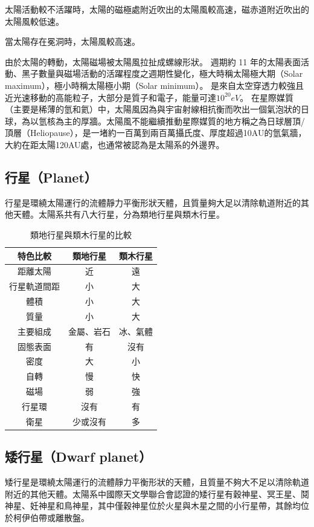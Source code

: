 \documentclass[a4paper,12pt]{report}
\begin{document}
太陽活動較不活躍時，太陽的磁極處附近吹出的太陽風較高速，磁赤道附近吹出的太陽風較低速。

當太陽存在冕洞時，太陽風較高速。

由於太陽的轉動，太陽磁場被太陽風拉扯成螺線形狀。
週期約 11 年的太陽表面活動、黑子數量與磁場活動的活躍程度之週期性變化，極大時稱太陽極大期（Solar maximum），極小時稱太陽極小期（Solar minimum）。
是來自太空穿透力較強且近光速移動的高能粒子，大部分是質子和電子，能量可達$10^20 eV$。
在星際媒質（主要是稀薄的氫和氦）中，太陽風因為與宇宙射線相抗衡而吹出一個氣泡狀的日球，為以氫核為主的厚牆。太陽風不能繼續推動星際媒質的地方稱之為日球層頂/頂層（Heliopause），是一堵約一百萬到兩百萬攝氏度、厚度超過10AU的氫氣牆，大約在距太陽120AU處，也通常被認為是太陽系的外邊界。
\subsection{行星（Planet）}
行星是環繞太陽運行的流體靜力平衡形狀天體，且質量夠大足以清除軌道附近的其他天體。太陽系共有八大行星，分為類地行星與類木行星。
\begin{table}[H]
\centering
\begin{tabular}{|c|c|c|}
\hline
\textbf{特色比較} & \textbf{類地行星} & \textbf{類木行星} \\ \hline
距離太陽 & 近 & 遠 \\ \hline
行星軌道間距 & 小 & 大 \\ \hline
體積 & 小 & 大 \\ \hline
質量 & 小 & 大 \\ \hline
主要組成 & 金屬、岩石 & 冰、氣體 \\ \hline
固態表面 & 有 & 沒有 \\ \hline
密度 & 大 & 小 \\ \hline
自轉 & 慢 & 快 \\ \hline
磁場 & 弱 & 強 \\ \hline
行星環 & 沒有 & 有 \\ \hline
衛星 & 少或沒有 & 多 \\ \hline
\end{tabular}
\caption{類地行星與類木行星的比較}
\end{table}\FB
\subsection{矮行星（Dwarf planet）}
矮行星是環繞太陽運行的流體靜力平衡形狀的天體，且質量不夠大不足以清除軌道附近的其他天體。太陽系中國際天文學聯合會認證的矮行星有穀神星、冥王星、鬩神星、妊神星和鳥神星，其中僅穀神星位於火星與木星之間的小行星帶，其餘均位於柯伊伯帶或離散盤。
\end{document}
